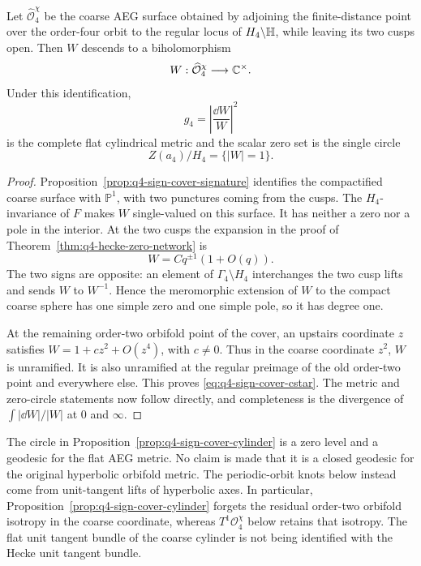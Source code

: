 \begin{proposition}
\label{prop:q4-sign-cover-cylinder}
Let \(\widehat{\mathcal O}_4^\chi\) be the coarse AEG surface obtained by
adjoining the finite-distance point over the order-four orbit to the regular
locus of \(H_4\backslash\mathbb{H}\), while leaving its two cusps open.  Then \(W\)
descends to a biholomorphism
\begin{equation}
 W:\widehat{\mathcal O}_4^\chi\longrightarrow\mathbb{C}^\times.
 \label{eq:q4-sign-cover-cstar}
\end{equation}
Under this identification,
\[
 g_4=\left|\frac{\dd W}{W}\right|^2
\]
is the complete flat cylindrical metric and the scalar zero set is the single
circle
\[
 Z(a_4)/H_4=\{|W|=1\}.
\]
\end{proposition}

\begin{proof}
Proposition~\ref{prop:q4-sign-cover-signature} identifies the compactified
coarse surface with \(\mathbb P^1\), with two punctures coming from the cusps.
The \(H_4\)-invariance of \(F\) makes \(W\) single-valued on this surface.
It has neither a zero nor a pole in the interior.  At the two cusps the
expansion in the proof of Theorem~\ref{thm:q4-hecke-zero-network} is
\[
 W=Cq^{\pm1}(1+O(q)).
\]
The two signs are opposite: an element of
\(\Gamma_4\setminus H_4\) interchanges the two cusp lifts and sends
\(W\) to \(W^{-1}\).  Hence the meromorphic extension of \(W\) to the
compact coarse sphere has one simple zero and one simple pole, so it has degree
one.

At the remaining order-two orbifold point of the cover, an upstairs coordinate
\(z\) satisfies \(W=1+cz^2+O(z^4)\), with \(c\ne0\).  Thus in the coarse
coordinate \(z^2\), \(W\) is unramified.  It is also unramified at the regular
preimage of the old order-two point and everywhere else.  This proves
\eqref{eq:q4-sign-cover-cstar}.  The metric and zero-circle statements now
follow directly, and completeness is the divergence of
\(\int |\dd W|/|W|\) at \(0\) and \(\infty\).
\end{proof}

\begin{remark}
\label{rem:q4-zero-circle-not-geodesic-knot}
The circle in Proposition~\ref{prop:q4-sign-cover-cylinder} is a zero level and
a geodesic for the flat AEG metric.  No claim is made that it is a closed
geodesic for the original hyperbolic orbifold metric.  The periodic-orbit knots
below instead come from unit-tangent lifts of hyperbolic axes.  In particular,
Proposition~\ref{prop:q4-sign-cover-cylinder} forgets the residual order-two
orbifold isotropy in the coarse coordinate, whereas $T^1\mathcal O_4^\chi$
below retains that isotropy.  The flat unit tangent bundle of the coarse
cylinder is not being identified with the Hecke unit tangent bundle.
\end{remark}

